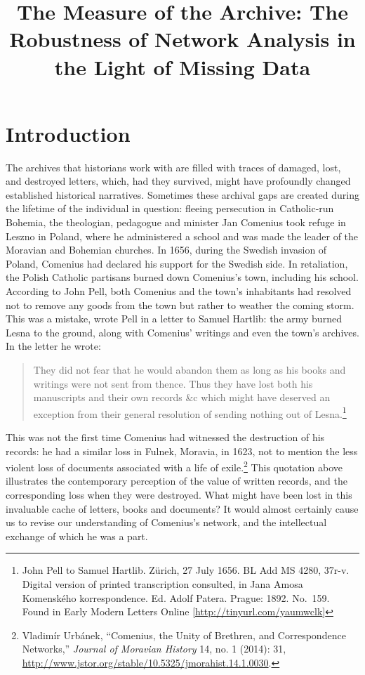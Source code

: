 \documentclass[]{article}
\title{The Measure of the Archive: The Robustness of Network Analysis in the Light of Missing Data}
\author{}
\date{\vspace{-2.5em}}
\begin{document}
\maketitle

\hypertarget{introduction}{%
\section{Introduction}\label{introduction}}

The archives that historians work with are filled with traces of damaged, lost, and destroyed letters, which, had they survived, might have profoundly changed established historical narratives. Sometimes these archival gaps are created during the lifetime of the individual in question: fleeing persecution in Catholic-run Bohemia, the theologian, pedagogue and minister Jan Comenius took refuge in Leszno in Poland, where he administered a school and was made the leader of the Moravian and Bohemian churches. In 1656, during the Swedish invasion of Poland, Comenius had declared his support for the Swedish side. In retaliation, the Polish Catholic partisans burned down Comenius's town, including his school. According to John Pell, both Comenius and the town's inhabitants had resolved not to remove any goods from the town but rather to weather the coming storm. This was a mistake, wrote Pell in a letter to Samuel Hartlib: the army burned Lesna to the ground, along with Comenius' writings and even the town's archives. In the letter he wrote:

\begin{quote}
They did not fear that he would abandon them as long as his books and writings were not sent from thence. Thus they have lost both his manuscripts and their own records \&c which might have deserved an exception from their general resolution of sending nothing out of Lesna.\footnote{John Pell to Samuel Hartlib. Zürich, 27 July 1656. BL Add MS 4280, 37r-v. Digital version of printed transcription consulted, in Jana Amosa Komenského korrespondence. Ed. Adolf Patera. Prague: 1892. No.~159. Found in Early Modern Letters Online {[}\url{http://tinyurl.com/yaumwclk}{]}}
\end{quote}

This was not the first time Comenius had witnessed the destruction of his records: he had a similar loss in Fulnek, Moravia, in 1623, not to mention the less violent loss of documents associated with a life of exile.\footnote{Vladimír Urbánek, ``Comenius, the Unity of Brethren, and Correspondence Networks,'' \emph{Journal of Moravian History} 14, no. 1 (2014): 31, \url{http://www.jstor.org/stable/10.5325/jmorahist.14.1.0030}.} This quotation above illustrates the contemporary perception of the value of written records, and the corresponding loss when they were destroyed. What might have been lost in this invaluable cache of letters, books and documents? It would almost certainly cause us to revise our understanding of Comenius's network, and the intellectual exchange of which he was a part.
\end{document}
